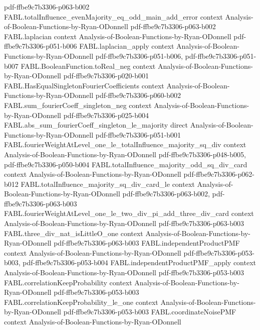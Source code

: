 \begin{theorem}
{    pdf-ffbe9c7b3306-p063-b002}
\proofstep
  {FABL.totalInfluence_evenMajority_eq_odd_main_add_error}
  {context}
  {Analysis-of-Boolean-Functions-by-Ryan-ODonnell}
  {pdf-ffbe9c7b3306-p063-b002}
\proofstep
  {FABL.laplacian}
  {context}
  {Analysis-of-Boolean-Functions-by-Ryan-ODonnell}
  {pdf-ffbe9c7b3306-p051-b006}
\proofstep
  {FABL.laplacian_apply}
  {context}
  {Analysis-of-Boolean-Functions-by-Ryan-ODonnell}
  {pdf-ffbe9c7b3306-p051-b006,
    pdf-ffbe9c7b3306-p051-b007}
\proofstep
  {FABL.BooleanFunction.toReal_neg}
  {context}
  {Analysis-of-Boolean-Functions-by-Ryan-ODonnell}
  {pdf-ffbe9c7b3306-p020-b001}
\proofstep
  {FABL.HasEqualSingletonFourierCoefficients}
  {context}
  {Analysis-of-Boolean-Functions-by-Ryan-ODonnell}
  {pdf-ffbe9c7b3306-p060-b002}
\proofstep
  {FABL.sum_fourierCoeff_singleton_neg}
  {context}
  {Analysis-of-Boolean-Functions-by-Ryan-ODonnell}
  {pdf-ffbe9c7b3306-p025-b004}
\proofstep
  {FABL.abs_sum_fourierCoeff_singleton_le_majority}
  {direct}
  {Analysis-of-Boolean-Functions-by-Ryan-ODonnell}
  {pdf-ffbe9c7b3306-p051-b001}
\proofstep
  {FABL.fourierWeightAtLevel_one_le_totalInfluence_majority_sq_div}
  {context}
  {Analysis-of-Boolean-Functions-by-Ryan-ODonnell}
  {pdf-ffbe9c7b3306-p048-b005,
    pdf-ffbe9c7b3306-p050-b004}
\proofstep
  {FABL.totalInfluence_majority_odd_sq_div_card}
  {context}
  {Analysis-of-Boolean-Functions-by-Ryan-ODonnell}
  {pdf-ffbe9c7b3306-p062-b012}
\proofstep
  {FABL.totalInfluence_majority_sq_div_card_le}
  {context}
  {Analysis-of-Boolean-Functions-by-Ryan-ODonnell}
  {pdf-ffbe9c7b3306-p063-b002,
    pdf-ffbe9c7b3306-p063-b003}
\proofstep
  {FABL.fourierWeightAtLevel_one_le_two_div_pi_add_three_div_card}
  {context}
  {Analysis-of-Boolean-Functions-by-Ryan-ODonnell}
  {pdf-ffbe9c7b3306-p063-b003}
\proofstep
  {FABL.three_div_nat_isLittleO_one}
  {context}
  {Analysis-of-Boolean-Functions-by-Ryan-ODonnell}
  {pdf-ffbe9c7b3306-p063-b003}
\proofstep
  {FABL.independentProductPMF}
  {context}
  {Analysis-of-Boolean-Functions-by-Ryan-ODonnell}
  {pdf-ffbe9c7b3306-p053-b003,
    pdf-ffbe9c7b3306-p053-b004}
\proofstep
  {FABL.independentProductPMF_apply}
  {context}
  {Analysis-of-Boolean-Functions-by-Ryan-ODonnell}
  {pdf-ffbe9c7b3306-p053-b003}
\proofstep
  {FABL.correlationKeepProbability}
  {context}
  {Analysis-of-Boolean-Functions-by-Ryan-ODonnell}
  {pdf-ffbe9c7b3306-p053-b003}
\proofstep
  {FABL.correlationKeepProbability_le_one}
  {context}
  {Analysis-of-Boolean-Functions-by-Ryan-ODonnell}
  {pdf-ffbe9c7b3306-p053-b003}
\proofstep
  {FABL.coordinateNoisePMF}
  {context}
  {Analysis-of-Boolean-Functions-by-Ryan-ODonnell}

\end{theorem}
